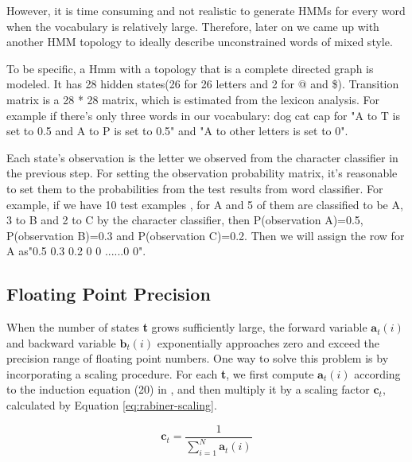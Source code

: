 \begin{enumerate}

However, it is time consuming and not realistic to generate HMMs for every word when the vocabulary is relatively large. Therefore, later on we came up with another HMM topology to ideally describe unconstrained words of mixed style.

To be specific, a Hmm  with a topology that is a complete directed graph is modeled. It has 28 hidden states(26 for 26 letters and 2 for @ and \$). 
Transition matrix is a 28 * 28 matrix, which is estimated from the lexicon analysis. For example if there's only three words in our vocabulary: dog cat cap for "A to T is set to 0.5 and A to P is set to 0.5" and "A to other letters is set to 0".

Each state's observation is the letter we observed from the character classifier in the previous step. For setting the observation probability matrix, it's reasonable to set them to the probabilities from the test results from word classifier. For example, if we have 10 test examples , for A and 5 of them are classified to be A, 3 to B and 2 to C by the character classifier, then P(observation A)=0.5, P(observation B)=0.3 and P(observation C)=0.2. Then we will assign the row for A as"0.5 0.3 0.2 0 0 ......0 0".

\end{enumerate}

\subsection{Floating Point Precision}

When the number of states \textbf{t} grows sufficiently large, the forward variable $\textbf{a}_t(i)$ and backward variable  $\textbf{b}_t(i)$  exponentially approaches zero and exceed the precision range of floating point numbers.
One way to solve this problem is by incorporating a scaling procedure.
For each \textbf{t}, we first compute $\textbf{a}_t(i)$ according to the induction equation (20) in  \cite{Rabiner1989}, and then multiply it by a scaling factor  $\textbf{c}_t$, calculated by Equation \ref{eq:rabiner-scaling}.

\begin{equation}\label{eq:rabiner-scaling}
\textbf{c}_t = \frac{1}{ \displaystyle\sum_{i=1}^N \textbf{a}_t(i)}
\end{equation}

